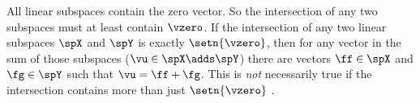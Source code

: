 All linear subspaces contain the zero vector.
So the intersection of any two subspaces must at least contain $\vzero$.
If the intersection of any two linear subspaces $\spX$ and $\spY$ is exactly $\setn{\vzero}$,
then for any vector in
the sum of those subspaces ($\vu\in\spX\adds\spY$) there are  vectors $\ff\in\spX$ and
$\fg\in\spY$ such that $\vu=\ff+\fg$.
This is \emph{not} necessarily true if the intersection contains more than just $\setn{\vzero}$
.


%
%
%
